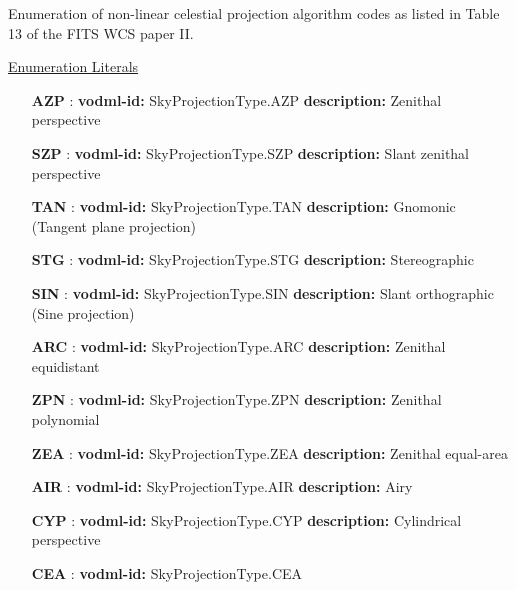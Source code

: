   Enumeration of non-linear celestial projection algorithm codes as listed in Table 13 of the FITS WCS paper II.

  \noindent \underline{Enumeration Literals}
  \vspace{-\parsep}
  \small
  \begin{itemize}
  
    \item[\textbf{AZP}]: \textbf{vodml-id:} SkyProjectionType.AZP \newline
          \textbf{description:} Zenithal perspective
    \item[\textbf{SZP}]: \textbf{vodml-id:} SkyProjectionType.SZP \newline
          \textbf{description:} Slant zenithal perspective
    \item[\textbf{TAN}]: \textbf{vodml-id:} SkyProjectionType.TAN \newline
          \textbf{description:} Gnomonic (Tangent plane projection)
    \item[\textbf{STG}]: \textbf{vodml-id:} SkyProjectionType.STG \newline
          \textbf{description:} Stereographic
    \item[\textbf{SIN}]: \textbf{vodml-id:} SkyProjectionType.SIN \newline
          \textbf{description:} Slant orthographic (Sine projection)
    \item[\textbf{ARC}]: \textbf{vodml-id:} SkyProjectionType.ARC \newline
          \textbf{description:} Zenithal equidistant
    \item[\textbf{ZPN}]: \textbf{vodml-id:} SkyProjectionType.ZPN \newline
          \textbf{description:} Zenithal polynomial
    \item[\textbf{ZEA}]: \textbf{vodml-id:} SkyProjectionType.ZEA \newline
          \textbf{description:} Zenithal equal-area
    \item[\textbf{AIR}]: \textbf{vodml-id:} SkyProjectionType.AIR \newline
          \textbf{description:} Airy
    \item[\textbf{CYP}]: \textbf{vodml-id:} SkyProjectionType.CYP \newline
          \textbf{description:} Cylindrical perspective
    \item[\textbf{CEA}]: \textbf{vodml-id:} SkyProjectionType.CEA \newline

\end{itemize}
